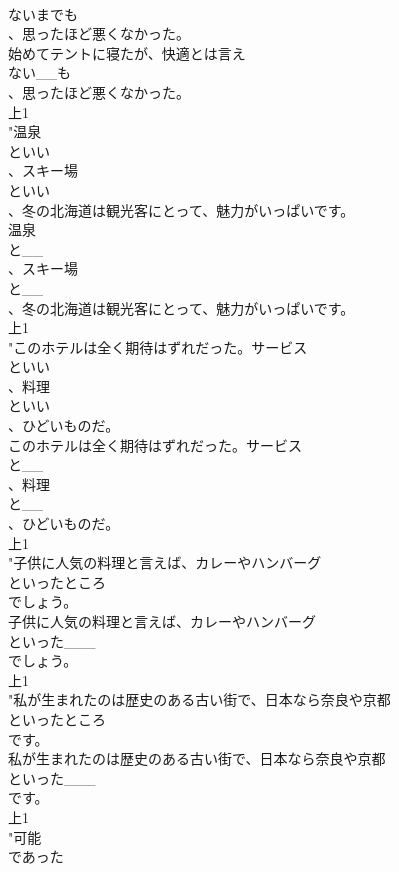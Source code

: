 \documentclass[8pt]{extreport}
\begin{document}
\begin{CJK}{UTF8}{min}
\\	ないまでも
\\	、思ったほど悪くなかった。
\\	始めてテントに寝たが、快適とは言え
\\	ない__も
\\	、思ったほど悪くなかった。
\\	上1
\\	"温泉
\\	といい
\\	、スキー場
\\	といい
\\	、冬の北海道は観光客にとって、魅力がいっぱいです。
\\	温泉
\\	と__
\\	、スキー場
\\	と__
\\	、冬の北海道は観光客にとって、魅力がいっぱいです。
\\	上1
\\	"このホテルは全く期待はずれだった。サービス
\\	といい
\\	、料理
\\	といい
\\	、ひどいものだ。
\\	このホテルは全く期待はずれだった。サービス
\\	と__
\\	、料理
\\	と__
\\	、ひどいものだ。
\\	上1
\\	"子供に人気の料理と言えば、カレーやハンバーグ
\\	といったところ
\\	でしょう。
\\	子供に人気の料理と言えば、カレーやハンバーグ
\\	といった___
\\	でしょう。
\\	上1
\\	"私が生まれたのは歴史のある古い街で、日本なら奈良や京都
\\	といったところ
\\	です。
\\	私が生まれたのは歴史のある古い街で、日本なら奈良や京都
\\	といった___
\\	です。
\\	上1
\\	"可能
\\	であった

\end{CJK}
\end{document}
